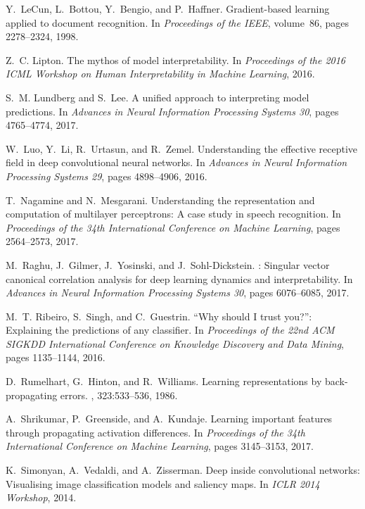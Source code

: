 \documentclass{article}
\begin{document}
\begin{thebibliography}{10}
Y.~LeCun, L.~Bottou, Y.~Bengio, and P.~Haffner.
\newblock Gradient-based learning applied to document recognition.
\newblock In {\em Proceedings of the IEEE}, volume~86, pages 2278--2324, 1998.

Z.~C. Lipton.
\newblock The mythos of model interpretability.
\newblock In {\em Proceedings of the 2016 ICML Workshop on Human
  Interpretability in Machine Learning}, 2016.

S.~M. Lundberg and S.~Lee.
\newblock A unified approach to interpreting model predictions.
\newblock In {\em Advances in Neural Information Processing Systems 30}, pages
  4765--4774, 2017.

W.~Luo, Y.~Li, R.~Urtasun, and R.~Zemel.
\newblock Understanding the effective receptive field in deep convolutional
  neural networks.
\newblock In {\em Advances in Neural Information Processing Systems 29}, pages
  4898--4906, 2016.

T.~Nagamine and N.~Mesgarani.
\newblock Understanding the representation and computation of multilayer
  perceptrons: A case study in speech recognition.
\newblock In {\em Proceedings of the 34th International Conference on Machine
  Learning}, pages 2564--2573, 2017.

M.~Raghu, J.~Gilmer, J.~Yosinski, and J.~Sohl-Dickstein.
: Singular vector canonical correlation analysis for deep
  learning dynamics and interpretability.
\newblock In {\em Advances in Neural Information Processing Systems 30}, pages
  6076--6085, 2017.

M.~T. Ribeiro, S.~Singh, and C.~Guestrin.
\newblock ``{W}hy should {I} trust you?'': Explaining the predictions of any
  classifier.
\newblock In {\em Proceedings of the 22nd ACM SIGKDD International Conference
  on Knowledge Discovery and Data Mining}, pages 1135--1144, 2016.

D.~Rumelhart, G.~Hinton, and R.~Williams.
\newblock Learning representations by back-propagating errors.
, 323:533--536, 1986.

A.~Shrikumar, P.~Greenside, and A.~Kundaje.
\newblock Learning important features through propagating activation
  differences.
\newblock In {\em Proceedings of the 34th International Conference on Machine
  Learning}, pages 3145--3153, 2017.

K.~Simonyan, A.~Vedaldi, and A.~Zisserman.
\newblock Deep inside convolutional networks: Visualising image classification
  models and saliency maps.
\newblock In {\em ICLR 2014 Workshop}, 2014.


\end{thebibliography}
\end{document}
